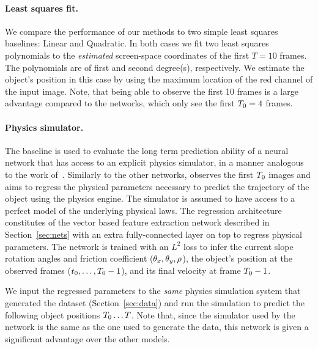 \paragraph{Least squares fit.} We compare the performance of our methods to two simple least squares baselines: Linear and Quadratic. In both cases we fit two least squares polynomials to the \emph{estimated} screen-space coordinates of the first $T=10$ frames. The polynomials are of first and second degree(s), respectively. We estimate the object's position in this case by using the maximum location of the red channel of the input image. Note, that being able to observe the first 10 frames is a large advantage compared to the networks, which only see the first $T_0=4$ frames.

\paragraph{Physics simulator.} The \SimNet baseline is used to evaluate the long term prediction ability of a neural network that has access to an explicit physics simulator, in a manner analogous to the work of~\cite{Galileo:NIPS:2015}.
Similarly to the other networks, \SimNet observes the first $T_0$ images and aims to regress the physical parameters necessary to predict the trajectory of the object using the physics engine. The simulator is assumed to have access to a perfect model of the underlying physical laws. The regression architecture constitutes of the vector based feature extraction network described in \mbox{Section~\ref{sec:nets}} with an extra fully-connected layer on top to regress physical parameters.
The network is trained with an $L^2$ loss to infer the current slope rotation angles and friction coefficient ($\theta_{x}, \theta_{y}, \rho$), the object's position at the observed frames ($t_0,\ldots,T_0-1$), and its final velocity at frame $T_0-1$.

We input the regressed parameters to the \emph{same} physics simulation system that generated the dataset (\mbox{Section~\ref{sec:data}}) and run the simulation to predict the following object positions $T_0 \ldots T$. Note that, since the simulator used by the network is the same as the one used to generate the data, this network is given a significant advantage over the other models.

